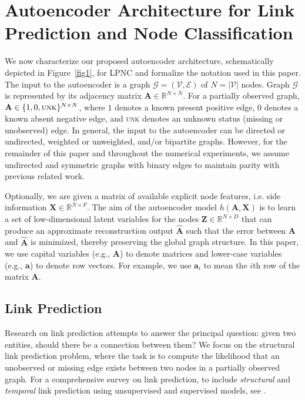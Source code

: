 \documentclass[letterpaper, conference]{IEEEtran}  %
\begin{document}
\section{Autoencoder Architecture for Link Prediction and Node Classification}

We now characterize our proposed autoencoder architecture, schematically depicted in Figure~\ref{fig1}, for LPNC and formalize the notation used in this paper. The input to the autoencoder is a graph $\mathcal{G} = (\mathcal{V}, \mathcal{E})$ of $N = |\mathcal{V}|$ nodes. Graph $\mathcal{G}$ is represented by its adjacency matrix $\mathbf{A} \in \mathbb{R}^{N \times N}$. For a partially observed graph, $\mathbf{A} \in \{1,0,\textsc{unk}\}^{N \times N}$, where $1$ denotes a known present positive edge, $0$ denotes a known absent negative edge, and \textsc{unk} denotes an unknown status (missing or unobserved) edge. In general, the input to the autoencoder can be directed or undirected, weighted or unweighted, and/or bipartite graphs. However, for the remainder of this paper and throughout the numerical experiments, we assume undirected and symmetric graphs with binary edges to maintain parity with previous related work.

Optionally, we are given a matrix of available explicit node features, i.e. side information $\mathbf{X} \in \mathbb{R}^{N \times F}$. The aim of the autoencoder model $h(\mathbf{A,X})$ is to learn a set of low-dimensional latent variables for the nodes $\mathbf{Z} \in \mathbb{R}^{N \times D}$ that can produce an approximate reconstruction output $\mathbf{\hat{A}}$ such that the error between $\mathbf{A}$ and $\mathbf{\hat{A}}$ is minimized, thereby preserving the global graph structure. In this paper, we use capital variables (e.g., $\mathbf{A}$) to denote matrices and lower-case variables (e.g., $\mathbf{a}$) to denote row vectors. For example, we use $\mathbf{a}_i$ to mean the $i$th row of the matrix $\mathbf{A}$.

\subsection{Link Prediction}

Research on link prediction attempts to answer the principal question: given two entities, should there be a connection between them? We focus on the structural link prediction problem, where the task is to compute the likelihood that an unobserved or missing edge exists between two nodes in a partially observed graph. For a comprehensive survey on link prediction, to include \emph{structural} and \emph{temporal} link prediction using unsupervised and supervised models, see \cite{Wang:2014}. \\
\end{document}
